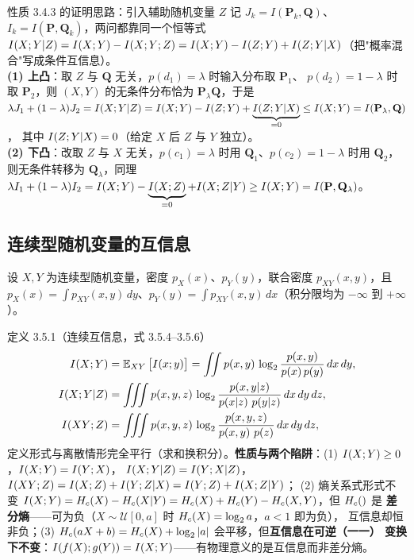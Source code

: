\begin{thmbox}{性质 3.4.3 的证明思路：引入辅助随机变量 $Z$}
记 $J_k=I(\mathbf{P}_k,\mathbf{Q})$、$I_k=I(\mathbf{P},\mathbf{Q}_k)$，两问都靠同一个恒等式
$I\!\left(X;Y|Z\right)=I\!\left(X;Y\right)-I\!\left(X;Y;Z\right)=I\!\left(X;Y\right)-I\!\left(Z;Y\right)+I\!\left(Z;Y|X\right)$（把"概率混合"写成条件互信息）。\\
\textbf{(1) 上凸}：取 $Z$ 与 $\mathbf{Q}$ 无关，$p(d_1)=\lambda$ 时输入分布取 $\mathbf{P}_1$、
$p(d_2)=1-\lambda$ 时取 $\mathbf{P}_2$，则 $(X,Y)$ 的无条件分布恰为
$\mathbf{P}_\lambda\mathbf{Q}$，于是
$\lambda J_1+(1-\lambda)J_2=I\!\left(X;Y|Z\right)
=I\!\left(X;Y\right)-I\!\left(Z;Y\right)+\underbrace{I\!\left(Z;Y|X\right)}_{=0}\le I\!\left(X;Y\right)=I(\mathbf{P}_\lambda,\mathbf{Q})$，
其中 $I\!\left(Z;Y|X\right)=0$（给定 $X$ 后 $Z$ 与 $Y$ 独立）。\\
\textbf{(2) 下凸}：改取 $Z$ 与 $X$ 无关，$p(c_1)=\lambda$ 时用 $\mathbf{Q}_1$、$p(c_2)=1-\lambda$
时用 $\mathbf{Q}_2$，则无条件转移为 $\mathbf{Q}_\lambda$，同理
$\lambda I_1+(1-\lambda)I_2=I\!\left(X;Y\right)-\underbrace{I\!\left(X;Z\right)}_{=0}+I\!\left(X;Z|Y\right)
\ge I\!\left(X;Y\right)=I(\mathbf{P},\mathbf{Q}_\lambda)$。
\end{thmbox}

\subsection{连续型随机变量的互信息}

设 $X,Y$ 为连续型随机变量，密度 $p_X(x)$、$p_Y(y)$，联合密度 $p_{XY}(x,y)$，且
$p_X(x)=\int p_{XY}(x,y)\,dy$、$p_Y(y)=\int p_{XY}(x,y)\,dx$（积分限均为
$-\infty$ 到 $+\infty$）。

\begin{defbox}{定义 3.5.1（连续互信息，式 3.5.4–3.5.6）}
\begin{align*}
\I{X;Y}&=\E_{XY}\big[I(x;y)\big]
=\iint\p{x,y}\,\lb\frac{\p{x,y}}{\p{x}\p{y}}\,dx\,dy,\\
\I{X;Y|Z}&=\iiint\p{x,y,z}\,
\lb\frac{\p{x,y|z}}{\p{x|z}\,\p{y|z}}\,dx\,dy\,dz,\\
\I{XY;Z}&=\iiint\p{x,y,z}\,
\lb\frac{\p{x,y,z}}{\p{x,y}\,\p{z}}\,dx\,dy\,dz,
\end{align*}
定义形式与离散情形完全平行（求和换积分）。\textbf{性质与两个陷阱}：(1) $I\!\left(X;Y\right)\ge0$，$I\!\left(X;Y\right)=I\!\left(Y;X\right)$，
$I\!\left(X;Y|Z\right)=I\!\left(Y;X|Z\right)$，$I\!\left(XY;Z\right)=I\!\left(X;Z\right)+I\!\left(Y;Z|X\right)=I\!\left(Y;Z\right)+I\!\left(X;Z|Y\right)$；
(2) 熵关系式形式不变 $I\!\left(X;Y\right)=H_{c}\!\left(X\right)-H_{c}\!\left(X|Y\right)=H_{c}\!\left(X\right)+H_{c}\!\left(Y\right)-H_{c}\!\left(X,Y\right)$，但 $H_{c}\!\left(\right)$ 是
\textbf{差分熵}——可为负（$X\sim\mathcal{U}[0,a]$ 时 $H_{c}\!\left(X\right)=\log_{2} a$，$a<1$ 即为负），
互信息却恒非负；(3) $H_{c}\!\left(aX+b\right)=H_{c}\!\left(X\right)+\log_{2}|a|$ 会平移，但\textbf{互信息在可逆（一一）
变换下不变}：$I\!\left(f(X);g(Y)\right)=I\!\left(X;Y\right)$——有物理意义的是互信息而非差分熵。
\end{defbox}


